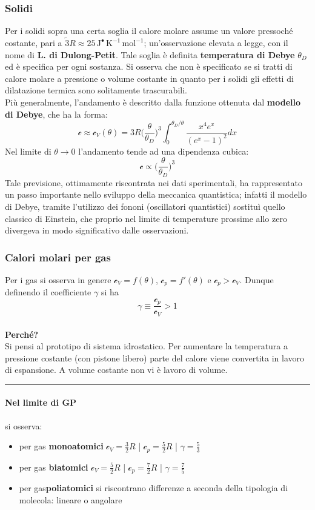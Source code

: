 \documentclass[10pt, oneside]{book}
\newcommand{\kelvin}[1]{\, \mathrm{K^{#1}}}
\newcommand{\joule}[1]{\, \mathrm{J^{#1}}}
\newcommand{\mols}[1]{\, \mathrm{mol^{#1}}}
\newcommand{\infobox}[2]{\vspace{0.5cm}~\\ \textbf{#1} \hrulefill \vspace{0.2cm}\\#2 {}\,\\\hrule \vspace{0.5cm}}
\newcommand{\ds}{\displaystyle}
\newcommand{\molhtv}{\mathcal{c}_V }
\newcommand{\molhtp}{\mathcal{c}_p }
\begin{document}
\subsubsection{Solidi}
Per i solidi sopra una certa soglia il calore molare assume un valore pressoché costante, pari a $\ds \tilde 3R \approx 25 \joule{•} \kelvin{-1} \mols{-1}$; un'osservazione elevata a legge, con il nome di \textbf{L. di Dulong-Petit}. Tale soglia è definita \textbf{temperatura di Debye} $\theta_D$ ed è specifica per ogni sostanza. Si osserva che non è specificato se si tratti di calore molare a pressione o volume costante in quanto per i solidi gli effetti di dilatazione termica sono solitamente trascurabili.\\
Più generalmente, l'andamento è descritto dalla funzione ottenuta dal \textbf{modello di Debye}, che ha la forma:
\[\mathcal{c} \approx \mathcal{c}_V(\theta)=3R\big(\frac{\theta}{\theta_D}\big)^3\int_{0}^{\theta_D/\theta}\frac{x^4 e^x}{(e^x-1)^2}dx\]
Nel limite di $\theta \rightarrow 0$ l'andamento tende ad una dipendenza cubica:
\[\mathcal{c} \propto \bigg(\frac{\theta}{\theta_D}\bigg)^3\]
Tale previsione, ottimamente riscontrata nei dati sperimentali, ha rappresentato un passo importante nello sviluppo della meccanica quantistica; infatti il modello di Debye, tramite l'utilizzo dei fononi (oscillatori quantistici) sostituì quello classico di Einstein, che proprio nel limite di temperature prossime allo zero divergeva in modo significativo dalle osservazioni.

\subsubsection{Calori molari per gas}
Per i gas si osserva in genere $\ds  \molhtv = f(\theta)$, $\molhtp = f'(\theta)$ e $\molhtp > \molhtv$. Dunque definendo il coefficiente $\gamma$ si ha
\[\gamma \equiv \frac{\molhtp}{\molhtv} > 1\]
\infobox{Perché?}{Si pensi al prototipo di sistema idrostatico. Per aumentare la temperatura a pressione costante (con pistone libero) parte del calore viene convertita in lavoro di espansione. A volume costante non vi è lavoro di volume.}
\paragraph{Nel limite di GP} si osserva:
\begin{itemize}
\item per gas \textbf{monoatomici} \hfill $\displaystyle \mathcal{c}_V = \frac{3}{2}R$ \hfill \bigg| \hfill $\displaystyle \mathcal{c}_p = \frac{5}{2} R$ \hfill \bigg| \hfill $\displaystyle \gamma = \frac{5}{3}$
\item per gas \textbf{biatomici}
\hfill $\displaystyle \mathcal{c}_V = \frac{5}{2}R$ \hfill \bigg| \hfill $\displaystyle \mathcal{c}_p = \frac{7}{2} R$ \hfill \bigg| \hfill $\displaystyle \gamma = \frac{7}{5}$
\item per gas\textbf{poliatomici} si riscontrano differenze a seconda della tipologia di molecola: lineare o angolare
\end{itemize}
\end{document}
